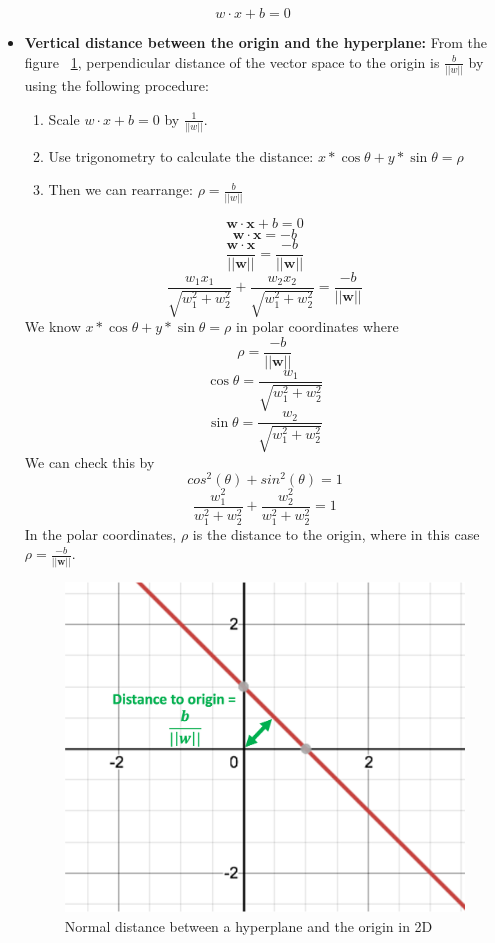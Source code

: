 \documentclass[11pt]{article}
\begin{document}
$$w \cdot x + b = 0$$
\begin{itemize}
\item{
\textbf{Vertical distance between the origin and the hyperplane:} From the figure ~\ref{fig:sfig3}, perpendicular distance of the vector space to the origin is $\frac{b}{||w||}$ by using the following procedure:

\begin{enumerate}
    \item Scale $w \cdot x + b = 0$ by $\frac{1}{||w||}$.
    \item Use trigonometry to calculate the distance: $x*\cos{\theta} + y*\sin{\theta} = \rho$
    \item Then we can rearrange: $\rho = \frac{b}{||w||}$
    
\end{enumerate}

$$\mathbf{w}\cdot \mathbf{x}+b=0$$
$$\mathbf{w}\cdot \mathbf{x}= -b$$
$$\frac{\mathbf{w} \cdot \mathbf{x} }{||\mathbf{w}||}= \frac{-b}{||\mathbf{w}||}$$
$$\frac{w_1 x_1}{\sqrt{w_1^2+w_2^2}} + \frac{w_2 x_2}{\sqrt{w_1^2+w_2^2}}= \frac{-b}{||\mathbf{w}||}$$
We know
$x*\cos{\theta} + y*\sin{\theta} = \rho$ in polar coordinates
where $$\rho = \frac{-b}{||\mathbf{w}||}$$
$$\cos{\theta} = \frac{w_1}{\sqrt{w_1^2+w_2^2}}$$
$$\sin{\theta} = \frac{w_2}{\sqrt{w_1^2+w_2^2}}$$
We can check this by $$cos^2 (\theta) + sin^2 (\theta) = 1$$
$$\frac{w_1^2}{w_1^2+w_2^2}+ \frac{w_2^2}{w_1^2+w_2^2} = 1$$
In the polar coordinates, $\rho$ is the distance to the origin, where in this case $\rho = \frac{-b}{||\mathbf{w}||}$.

\begin{figure}[H]
  \centering
  \includegraphics[width=.4\linewidth]{images/distance.png}
  \caption{Normal distance between a hyperplane and the origin in 2D}
  \label{fig:sfig3}
\end{figure}
}


\end{itemize}
\end{document}
